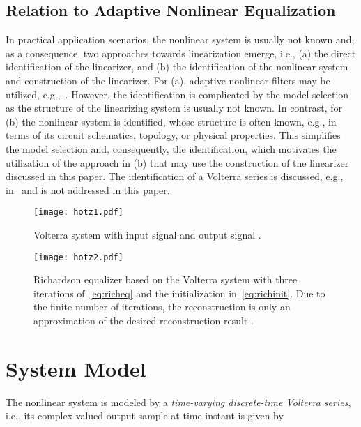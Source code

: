 \documentclass[10pt,twocolumn,twoside]{IEEEtran}
\begin{document}
\subsection{Relation to Adaptive Nonlinear Equalization}

In practical application scenarios, the nonlinear system is usually not
known and, as a consequence, two approaches towards linearization emerge, i.e.,
(a) the direct identification of the linearizer, and
(b) the identification of the nonlinear system and construction
of the linearizer. For (a), adaptive nonlinear filters may be utilized, e.g.,~\cite{mathews1991}.
However, the identification is complicated by the model selection as
the structure of the linearizing system is usually not known.
In contrast, for (b) the nonlinear system is identified,
whose structure is often known, e.g., in terms of its circuit schematics,
topology, or physical properties. This simplifies the model selection and,
consequently, the identification, which motivates the utilization of the
approach in (b) that may use the construction of the linearizer
discussed in this paper. The identification of a Volterra series is discussed, e.g.,
in~\cite{mathews2000,glentis1999,nemeth2002,weng2006,giannakis2001}
and is not addressed in this paper. 

\begin{figure}[!t]
	\centering
	\texttt{[image: hotz1.pdf]}
	\caption{Volterra system  with input signal  and output signal .}
	\label{fig:volterrasystem}
\end{figure}

\begin{figure*}[!t]
	\centering
	\texttt{[image: hotz2.pdf]}
	\caption{Richardson equalizer based on the Volterra system 
		with three iterations of~\eqref{eq:richeq} and the initialization in~\eqref{eq:richinit}.
		Due to the finite number of iterations, the reconstruction  is only an approximation
		of the desired reconstruction result .}
	\label{fig:richeq}
\end{figure*}



\section{System Model}
	\label{model}

The nonlinear system is modeled by a \emph{time-varying discrete-time Volterra series}, i.e.,
its complex-valued output sample  at time instant  is given
by~\cite{schetzen1980,rugh1981,mathews2000}
\end{document}
